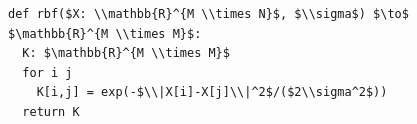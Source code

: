 \documentclass[border=10pt]{standalone}
\begin{document}
\begin{lstlisting}
def rbf($X: \\mathbb{R}^{M \\times N}$, $\\sigma$) $\to$ $\mathbb{R}^{M \\times M}$:
  K: $\mathbb{R}^{M \\times M}$
  for i j
    K[i,j] = exp(-$\\|X[i]-X[j]\\|^2$/($2\\sigma^2$))
  return K
\end{lstlisting}
\end{document}
